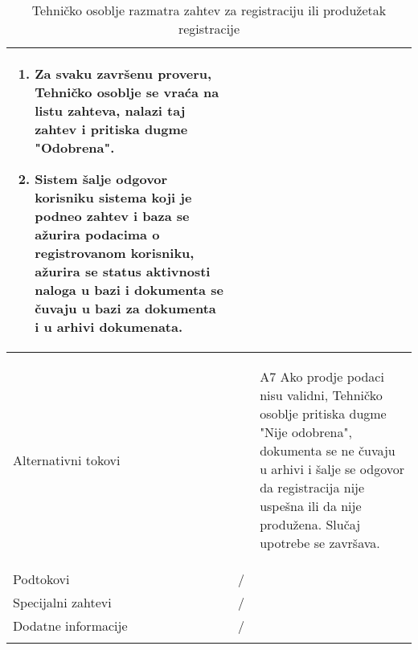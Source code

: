 \documentclass{article}
\begin{document}
\begin{longtable}{| p{} | p{} |}
\begin{enumerate}
                    \item Za svaku završenu proveru, Tehničko osoblje se vraća na listu zahteva, nalazi taj zahtev i pritiska dugme "Odobrena".
                    \item Sistem šalje odgovor korisniku sistema koji je podneo zahtev i baza se ažurira podacima o registrovanom korisniku, ažurira se status aktivnosti naloga u bazi i dokumenta se čuvaju u bazi za dokumenta i u arhivi dokumenata. 
                \end{enumerate}\\
            \hline
                Alternativni tokovi & 
                \begin{enumerate}
                    \item[A7] Ako prodje podaci nisu validni, Tehničko osoblje pritiska dugme "Nije odobrena", dokumenta se ne čuvaju u arhivi i šalje se odgovor da registracija nije uspešna ili da nije produžena. Slučaj upotrebe se završava.
                \end{enumerate}\\
            \hline
                Podtokovi & /\\
            \hline
                Specijalni zahtevi & /\\
            \hline
                Dodatne informacije & / \\
            \hline
            \caption{Tehničko osoblje razmatra zahtev za registraciju ili produžetak registracije}
        \end{longtable}
\end{document}
